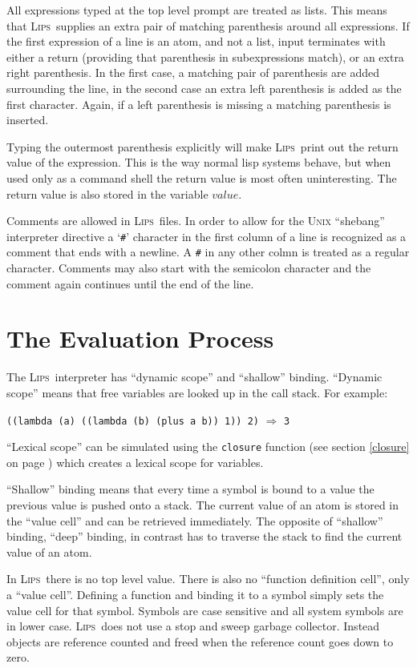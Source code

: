 \documentclass[a4paper]{article}
\newcommand{\lips}{\textsc{Lips}}
\newcommand{\lisp}[1]{\texttt{#1}}
\newcommand{\example}[2]{
  \begin{adjustwidth}{0.2cm}{}
    \lisp{#1} $\Rightarrow$ \lisp{#2}
  \end{adjustwidth}
}
\begin{document}
All expressions typed at the top level prompt are treated as lists.
This means that \lips\ supplies an extra pair of matching parenthesis
around all expressions.  If the first expression of a line is an atom,
and not a list, input terminates with either a return (providing that
parenthesis in subexpressions match), or an extra right parenthesis.
In the first case, a matching pair of parenthesis are added
surrounding the line, in the second case an extra left parenthesis is
added as the first character.  Again, if a left parenthesis is missing
a matching parenthesis is inserted.

Typing the outermost parenthesis explicitly will make \lips\ print out
the return value of the expression.  This is the way normal lisp
systems behave, but when used only as a command shell the return value
is most often uninteresting.  The return value is also stored in the
variable $value$.

Comments are allowed in \lips\ files.  In order to allow for the
\textsc{Unix} ``shebang'' interpreter directive a `\lisp{\#}'
character in the first column of a line is recognized as a comment
that ends with a newline. A \lisp{\#} in any other colmn is treated as
a regular character.  Comments may also start with the semicolon
character and the comment again continues until the end of the line.

\section{The Evaluation Process}
The \lips\ interpreter has ``dynamic scope'' and ``shallow'' binding.
``Dynamic scope'' means that free variables are looked up in the call
stack. For example:

\example{((lambda (a) ((lambda (b) (plus a b)) 1)) 2)}{3}

``Lexical scope'' can be simulated using the \lisp{closure} function
(see section \ref{closure} on page \pageref{closure}) which creates a
lexical scope for variables.

``Shallow'' binding means that every time a symbol is bound to a value
the previous value is pushed onto a stack.  The current value of an
atom is stored in the ``value cell'' and can be retrieved immediately.
The opposite of ``shallow'' binding, ``deep'' binding, in contrast has
to traverse the stack to find the current value of an atom.

In \lips\ there is no top level value.  There is also no ``function
definition cell'', only a ``value cell''.  Defining a function and
binding it to a symbol simply sets the value cell for that symbol.
Symbols are case sensitive and all system symbols are in lower case.
\lips\ does not use a stop and sweep garbage collector.  Instead
objects are reference counted and freed when the reference count goes
down to zero.
\end{document}
